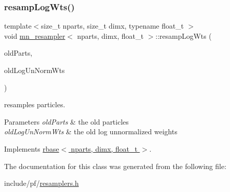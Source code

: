 \subsubsection{\texorpdfstring{resamp\+Log\+Wts()}{resampLogWts()}}
{\footnotesize\ttfamily template$<$size\+\_\+t nparts, size\+\_\+t dimx, typename float\+\_\+t $>$ \\
void \hyperlink{classmn__resampler}{mn\+\_\+resampler}$<$ nparts, dimx, float\+\_\+t $>$\+::resamp\+Log\+Wts (\begin{DoxyParamCaption}\item[{\hyperlink{classrbase_aa12fc826befa6ba0647b5f59ebc396ee}{array\+Vec} \&}]{old\+Parts,  }\item[{\hyperlink{classrbase_a6f76bef853e508cb5b6f546d231b06f5}{array\+Float} \&}]{old\+Log\+Un\+Norm\+Wts }\end{DoxyParamCaption})\hspace{0.3cm}{\ttfamily [virtual]}}



resamples particles. 


\begin{DoxyParams}{Parameters}
{\em old\+Parts} & the old particles \\
\hline
{\em old\+Log\+Un\+Norm\+Wts} & the old log unnormalized weights \\
\hline
\end{DoxyParams}


Implements \hyperlink{classrbase_aff0f6f88fd4656e67f5ebc870f10dd44}{rbase$<$ nparts, dimx, float\+\_\+t $>$}.



The documentation for this class was generated from the following file\+:\begin{DoxyCompactItemize}
\item 
include/pf/\hyperlink{resamplers_8h}{resamplers.\+h}\end{DoxyCompactItemize}
